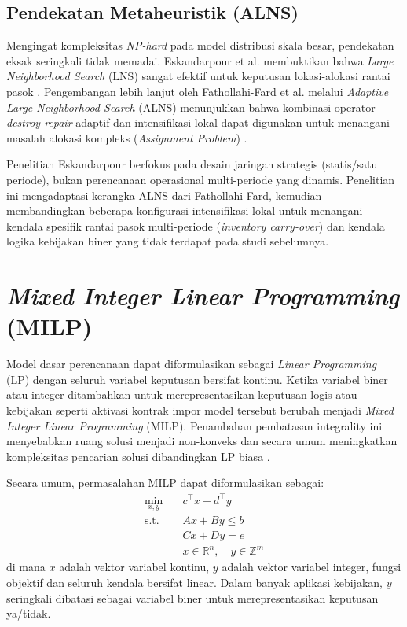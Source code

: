 \documentclass{file/TA-ITS}
\theoremstyle{definition}
\theoremstyle{definition}
\theoremstyle{plain}
\begin{document}
\subsection{Pendekatan Metaheuristik (ALNS)}
Mengingat kompleksitas \textit{NP-hard} pada model distribusi skala besar, pendekatan eksak seringkali tidak memadai. Eskandarpour et al. membuktikan bahwa \textit{Large Neighborhood Search} (LNS) sangat efektif untuk keputusan lokasi-alokasi rantai pasok \cite{ESKANDARPOUR2017lns_supply}. Pengembangan lebih lanjut oleh Fathollahi-Fard et al. melalui \textit{Adaptive Large Neighborhood Search} (ALNS) menunjukkan bahwa kombinasi operator \textit{destroy-repair} adaptif dan intensifikasi lokal dapat digunakan untuk menangani masalah alokasi kompleks (\textit{Assignment Problem}) \cite{fathollahifard2023alns}.

Penelitian Eskandarpour berfokus pada desain jaringan strategis (statis/satu periode), bukan perencanaan operasional multi-periode yang dinamis. Penelitian ini mengadaptasi kerangka ALNS dari Fathollahi-Fard, kemudian membandingkan beberapa konfigurasi intensifikasi lokal untuk menangani kendala spesifik rantai pasok multi-periode (\textit{inventory carry-over}) dan kendala logika kebijakan biner yang tidak terdapat pada studi sebelumnya.

\section{\textit{Mixed Integer Linear Programming} (MILP)}
Model dasar perencanaan dapat diformulasikan sebagai \textit{Linear Programming} (LP) dengan seluruh variabel keputusan bersifat kontinu. Ketika variabel biner atau integer ditambahkan untuk merepresentasikan keputusan logis atau kebijakan seperti aktivasi kontrak impor model tersebut berubah menjadi \textit{Mixed Integer Linear Programming} (MILP). Penambahan pembatasan integrality ini menyebabkan ruang solusi menjadi non-konveks dan secara umum meningkatkan kompleksitas pencarian solusi dibandingkan LP biasa \cite{ntnu_milp}.

Secara umum, permasalahan MILP dapat diformulasikan sebagai:
\begin{align}
\label{eq:milp_general}
\min_{x,y} \quad & c^\top x + d^\top y \\
\text{s.t.} \quad & A x + B y \leq b \\
& C x + D y = e \\
& x \in \mathbb{R}^n, \quad y \in \mathbb{Z}^m
\end{align}
di mana $x$ adalah vektor variabel kontinu, $y$ adalah vektor variabel integer, fungsi objektif dan seluruh kendala bersifat linear. Dalam banyak aplikasi kebijakan, $y$ seringkali dibatasi sebagai variabel biner untuk merepresentasikan keputusan ya/tidak.
\end{document}
